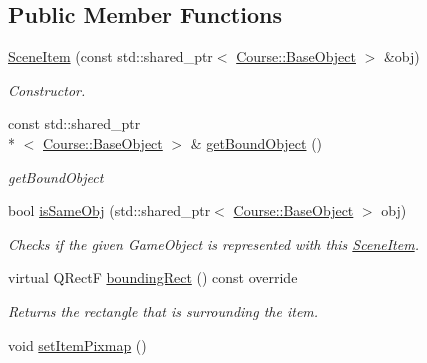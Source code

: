 \subsection*{Public Member Functions}
\begin{DoxyCompactItemize}
\item 
\hyperlink{class_student_1_1_scene_item_a60d91353e37f40478c059b30be4c6ed6}{Scene\-Item} (const std\-::shared\-\_\-ptr$<$ \hyperlink{class_course_1_1_base_object}{Course\-::\-Base\-Object} $>$ \&obj)
\begin{DoxyCompactList}\small\item\em Constructor. \end{DoxyCompactList}\item 
const std\-::shared\-\_\-ptr\\*
$<$ \hyperlink{class_course_1_1_base_object}{Course\-::\-Base\-Object} $>$ \& \hyperlink{class_student_1_1_scene_item_a7491e26f9280fad9e5af250d0804a787}{get\-Bound\-Object} ()
\begin{DoxyCompactList}\small\item\em get\-Bound\-Object \end{DoxyCompactList}\item 
bool \hyperlink{class_student_1_1_scene_item_a2d776aaee48338e664826cc1bf838596}{is\-Same\-Obj} (std\-::shared\-\_\-ptr$<$ \hyperlink{class_course_1_1_base_object}{Course\-::\-Base\-Object} $>$ obj)
\begin{DoxyCompactList}\small\item\em Checks if the given Game\-Object is represented with this \hyperlink{class_student_1_1_scene_item}{Scene\-Item}. \end{DoxyCompactList}\item 
virtual Q\-Rect\-F \hyperlink{class_student_1_1_scene_item_a001b7dbcb91dbd7217b8cded7f9fac18}{bounding\-Rect} () const override
\begin{DoxyCompactList}\small\item\em Returns the rectangle that is surrounding the item. \end{DoxyCompactList}\item 
\hypertarget{class_student_1_1_scene_item_a424479e044042979058a95357dba3f9b}{void \hyperlink{class_student_1_1_scene_item_a424479e044042979058a95357dba3f9b}{set\-Item\-Pixmap} ()}\label{class_student_1_1_scene_item_a424479e044042979058a95357dba3f9b}


\end{DoxyCompactItemize}
